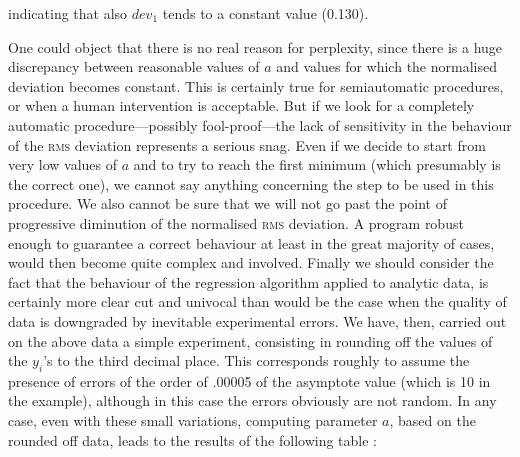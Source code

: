 \documentclass[%
 aip,
 jmp,%
 amsmath,amssymb,
 reprint,%
]{revtex4-1}
\begin{document}
indicating that also $dev_1$ tends to a constant value (0.130).

One could object  that there is no real reason for perplexity, since there is a huge discrepancy between reasonable values of $a$ and values for which the normalised deviation becomes constant. This is certainly true for semiautomatic procedures,  or  when a human intervention is acceptable.
But if we look for a completely automatic procedure---possibly fool-proof---the lack of sensitivity in  the  behaviour  of  the  \textsc{rms} deviation represents a serious snag.
Even if we decide to start from very low values of $a$ and to try to reach the first minimum (which presumably is the correct one), we cannot say anything concerning the step to be  used in this procedure. We  also cannot be sure that  we  will not go past the point of progressive diminution of the normalised \textsc{rms} deviation. A program robust enough to guarantee a correct behaviour at least in the great majority of cases, would then become quite complex and involved.
Finally we should consider the fact that the behaviour of the regression algorithm applied to analytic data, is certainly more clear cut and univocal than would be the case when the quality of data is downgraded by inevitable experimental errors.
We have,  then, carried  out  on the  above data a simple experiment, consisting in rounding off the values of the $y_i$'s to the third decimal place.
This corresponds roughly to assume the presence of errors of the order of .00005 of the asymptote value (which is	10 in the  example), although in this case the errors obviously are not random.
In any case, even with these small variations, computing parameter $a$, based on the rounded off data, leads to the results of the following table :
\end{document}
